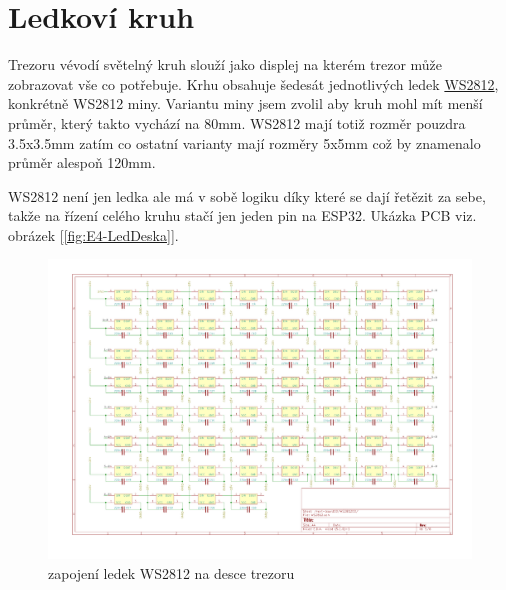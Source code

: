 \section*{Ledkoví kruh}

Trezoru vévodí světelný kruh slouží jako displej na kterém trezor může zobrazovat vše co potřebuje. Krhu obsahuje šedesát jednotlivých ledek 
\href{https://cdn-shop.adafruit.com/datasheets/WS2812B.pdf}{WS2812}, konkrétně WS2812 miny. Variantu miny jsem zvolil aby kruh mohl mít menší
průměr, který takto vychází na 80mm. WS2812 mají totiž rozměr pouzdra 3.5x3.5mm zatím co ostatní varianty mají 
rozměry 5x5mm což by znamenalo průměr alespoň 120mm.

WS2812 není jen ledka ale má v sobě logiku díky které se dají řetězit za sebe, takže na řízení celého kruhu stačí jen jeden pin na ESP32.\newline
Ukázka PCB viz. obrázek [\ref{fig:E4-LedDeska}].
\begin{figure}[htbp]
    \centering
    \includegraphics[width=\textwidth]{kapitoly/obrazky/E4/WS2812/zapojeni_WS2812.pdf}
    \caption{zapojení ledek WS2812 na desce trezoru}
    \label{fig:E4-sch_civka_tercik}
\end{figure}

\newpage